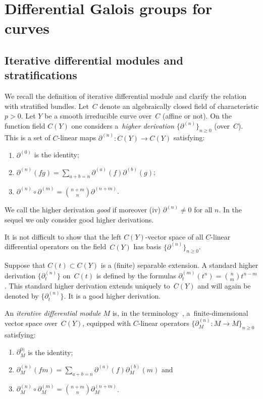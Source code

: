 \documentclass[pdftex]{sigma}
\numberwithin{equation}{section}
\begin{document}
\section{Differential Galois groups for curves}\label{section2}
\subsection{Iterative differential modules and stratifications}\label{section2.1}

We recall the definition of iterative differential module and clarify the relation with stratified bundles. Let~$C$ denote an algebraically closed field of characteristic $p>0$. Let $Y$ be a smooth irreducible curve over~$C$ (affine or not). On the function field $C(Y)$ one considers a~{\it higher derivation} $\big\{\partial ^{(n)}\big\}_{n\geq 0}$ (over~$C$). This is a set of $C$-linear maps $\partial^{(n)}\colon C(Y)\rightarrow C(Y)$ satisfying:
\begin{enumerate}\itemsep=0pt
\item[(i)] $\partial^{(0)}$ is the identity;
\item[(ii)] $\partial ^{(n)}(fg)=\sum\limits_{a+b=n}\partial^{(a)}(f)\partial^{(b)}(g)$;
\item[(iii)] $\partial ^{(n)}\circ \partial ^{(m)}={n+m\choose n}\partial ^{(n+m)}$.
\end{enumerate}
We call the higher derivation {\it good} if moreover (iv) $\partial^{(n)}\neq 0$ for all $n$. In the sequel we only consider good higher derivations.

It is not difficult to show that the left $C(Y)$-vector space of all $C$-linear differential operators on the field~$C(Y)$ has basis $\big\{\partial ^{(n)}\big\}_{n\geq 0}$.

\begin{Example} Suppose that $C(t)\subset C(Y)$ is a (finite) separable extension. A standard higher derivation $\big\{\partial^{(n)}_t\big\}$ on~$C(t)$ is defined by the formulas $\partial_t^{(m)}(t^n)={n\choose m }t^{n-m}$. This standard higher derivation extends uniquely to~$C(Y)$ and will again be denoted by $\big\{\partial^{(n)}_t\big\}$. It is a good higher derivation.
\end{Example}

An {\it iterative differential module} $M$ is, in the terminology~\cite{Ma-vdP1}, a~finite-dimensional vector space over~$C(Y)$, equipped with $C$-linear operators $\big\{\partial_M^{(n)}\colon M\rightarrow M\big\}_{n\geq 0}$ satisfying:
\begin{enumerate}\itemsep=0pt
\item[(a)] $\partial_M^{0)}$ is the identity;
\item[(b)] $\partial^{(n)}_M(fm)=\sum\limits _{a+b=n}\partial^{(a)}(f)\partial_M^{(b)}(m)$ and
\item[(c)] $\partial _M^{(n)}\circ \partial _M^{(m)}={n+m\choose n }\partial_M^{(n+m)}$.
\end{enumerate}
\end{document}
